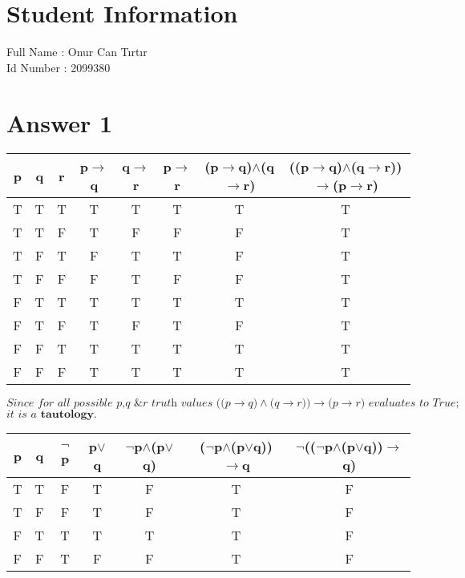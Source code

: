 \documentclass[12pt]{article}
\begin{document}
\section*{Student Information } 
Full Name :  Onur Can Tırtır\\
Id Number :  2099380

\section*{Answer 1}
\begin{center}
\begin{tabular}{|ccc|c|c|c|c|c|}
\hline
p & q & r & p$\to$q & q$\to$r & p$\to$r & (p$\to$q)$\wedge$(q$\to$r) & ((p$\to$q)$\wedge$(q$\to$r))$\to$(p$\to$r) \\
\hline
T & T & T & T & T & T & T & T\\
T & T & F & T & F & F & F & T\\
T & F & T & F & T & T & F & T\\
T & F & F & F & T & F & F & T\\
F & T & T & T & T & T & T & T\\
F & T & F & T & F & T & F & T\\
F & F & T & T & T & T & T & T\\
F & F & F & T & T & T & T & T\\
\hline
\end{tabular}
\end{center}

$\textit{Since for all possible p,q \& r truth values ((p$\to$q)$\wedge$(q$\to$r))$\to$(p$\to$r) evaluates to True;}$
\\
$\textit{it is a $\textbf{tautology}.$}$
\\

\begin{tabular}{|cc|c|c|c|c|c|}
\hline
p & q & $\neg$p & p$\vee$q & $\neg$p$\wedge$(p$\vee $q) & ($\neg $p$\wedge$(p$\vee $q))$\to$q & $\neg$(($\neg$p$\wedge$(p$\vee $q))$\to$q) \\
\hline
T & T & F & T & F & T & F\\
T & F & F & T & F & T & F\\
F & T & T & T & T & T & F\\
F & F & T & F & F & T & F\\
\hline
\end{tabular}\\
\\
\end{document}
